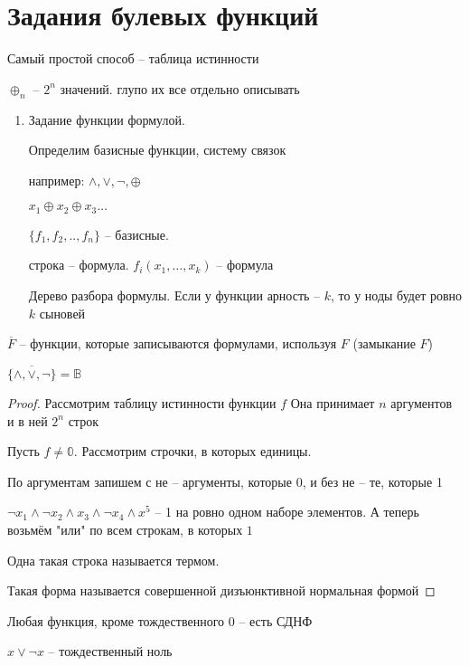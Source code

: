 \documentclass{book}
\theoremstyle{definition}
\begin{document}
    \section{Задания булевых функций}

    Самый простой способ -- таблица истинности

    $\oplus_n$ -- $2^n$ значений. глупо их все отдельно описывать

    \begin{enumerate}
        \item Задание функции формулой.

            Определим базисные функции, систему связок

            например: $\land, \vee, \neg, \oplus$

            $x_1 \oplus x_2 \oplus x_3 \ldots $

            $\{f_1, f_2, .., f_n\}$ -- базисные.

            строка -- формула. $f_i(x_1, \ldots, x_k)$ -- формула

            \begin{definition}
                Дерево разбора формулы. Если у функции арность -- $k$, то у ноды будет ровно $k$ сыновей
            \end{definition}
    \end{enumerate}

    $\overline{F}$ --  функции, которые записываются формулами, используя $F$ (замыкание $F$)

    \begin{theorem}
         $\overline{\{\land, \vee, \neg\}} = \mathbb{B}$
    \end{theorem}
    \begin{proof}
        Рассмотрим таблицу истинности функции $f$ Она принимает $n$ аргументов и в ней $2^n$ строк

        Пусть $f\neq \mathbb{0}$. Рассмотрим строчки, в которых единицы.

        По аргументам запишем с не -- аргументы, которые 0, и без не -- те, которые 1

        $\neg x_1 \land \neg x_2 \land x_3 \land \neg x_4 \land x^5$ -- 1 на ровно одном наборе элементов. А теперь возьмём "или" по всем строкам, в которых $1$ 

        Одна такая строка называется термом. 

        Такая форма называется совершенной дизъюнктивной нормальная формой
    \end{proof}
    \begin{lemma}
        Любая функция, кроме тождественного 0  -- есть СДНФ

        $x\vee \neg x$ -- тождественный ноль
    \end{lemma}
\end{document}
